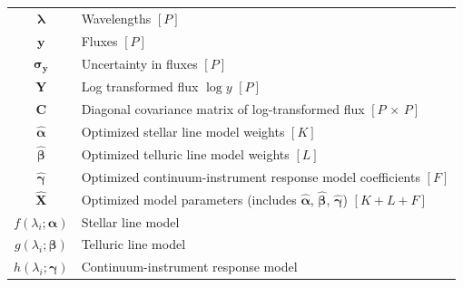 \documentclass[modern,linenumbers]{aastex631}
\renewcommand{\vec}[1]{\mathbf{#1}}
\newcommand{\vecalpha}{\boldsymbol{\alpha}}
\newcommand{\vecbeta}{\boldsymbol{\beta}}
\newcommand{\vecgamma}{\boldsymbol{\gamma}}
\begin{document}
\begin{table}
\begin{tabular}{cl}
        $\mathbf{\lambda}$ & Wavelengths $[P]$\\ %
        $\mathbf{y}$ & Fluxes $[P]$\\
        $\mathbf{\sigma_y}$ & Uncertainty in fluxes $[P]$\\
        $\mathbf{Y}$ & Log transformed flux $\log{y}$ $[P]$\\
        $\mathbf{C}$ & Diagonal covariance matrix of log-transformed flux $[P\,\times\,P]$\\
        $\hat{\vecalpha}$ & Optimized stellar line model weights $[K]$\\
        $\hat{\vecbeta}$ & Optimized telluric line model weights $[L]$\\
        $\hat{\vecgamma}$ & Optimized continuum-instrument response model coefficients $[F]$\\
        $\hat{\vec{X}}$ & Optimized model parameters (includes $\hat{\vecalpha}$, $\hat{\vecbeta}$, $\hat{\vecgamma}$) $[K + L + F]$\\
        $f(\lambda_i; \vecalpha)$ & Stellar line model \\
        $g(\lambda_i; \vecbeta)$ & Telluric line model \\
        $h(\lambda_i; \vecgamma)$ & Continuum-instrument response model \\
        \hline
    \end{tabular}
    \label{tab:nomenclature}
\end{table}
\end{document}
